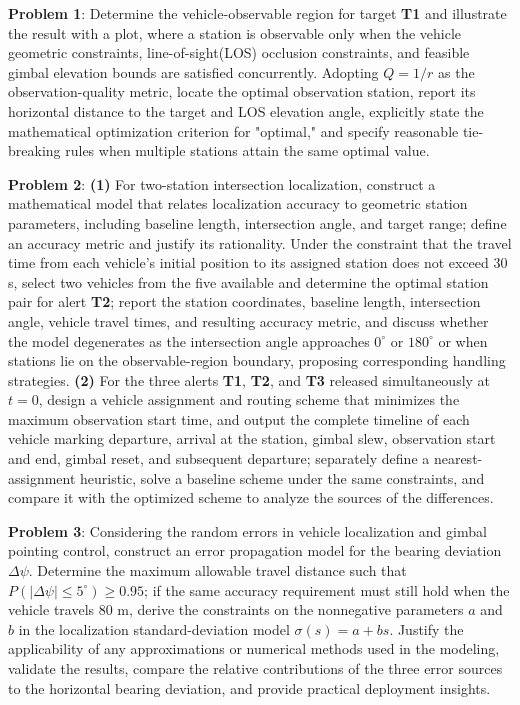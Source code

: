 \documentclass{swmcmthesis}
\begin{document}
\textbf{Problem 1}: Determine the vehicle-observable region for target \textbf{T1} and illustrate the result with a plot, where a station is observable only when the vehicle geometric constraints, line-of-sight(LOS) occlusion constraints, and feasible gimbal elevation bounds are satisfied concurrently. Adopting $Q = 1/r$ as the observation-quality metric, locate the optimal observation station, report its horizontal distance to the target and LOS elevation angle, explicitly state the mathematical optimization criterion for "optimal," and specify reasonable tie-breaking rules when multiple stations attain the same optimal value.

\textbf{Problem 2}: \textbf{(1)} For two-station intersection localization, construct a mathematical model that relates localization accuracy to geometric station parameters, including baseline length, intersection angle, and target range; define an accuracy metric and justify its rationality. Under the constraint that the travel time from each vehicle's initial position to its assigned station does not exceed 30 s, select two vehicles from the five available and determine the optimal station pair for alert \textbf{T2}; report the station coordinates, baseline length, intersection angle, vehicle travel times, and resulting accuracy metric, and discuss whether the model degenerates as the intersection angle approaches $0^\circ$ or $180^\circ$ or when stations lie on the observable-region boundary, proposing corresponding handling strategies. \textbf{(2)} For the three alerts \textbf{T1}, \textbf{T2}, and \textbf{T3} released simultaneously at $t = 0$, design a vehicle assignment and routing scheme that minimizes the maximum observation start time, and output the complete timeline of each vehicle marking departure, arrival at the station, gimbal slew, observation start and end, gimbal reset, and subsequent departure; separately define a nearest-assignment heuristic, solve a baseline scheme under the same constraints, and compare it with the optimized scheme to analyze the sources of the differences.

\textbf{Problem 3}: Considering the random errors in vehicle localization and gimbal pointing control, construct an error propagation model for the bearing deviation $\Delta\psi$. Determine the maximum allowable travel distance such that $P(|\Delta\psi| \leq 5^\circ) \geq 0.95$; if the same accuracy requirement must still hold when the vehicle travels 80 m, derive the constraints on the nonnegative parameters $a$ and $b$ in the localization standard-deviation model $\sigma(s) = a + bs$. Justify the applicability of any approximations or numerical methods used in the modeling, validate the results, compare the relative contributions of the three error sources to the horizontal bearing deviation, and provide practical deployment insights.
\end{document}

